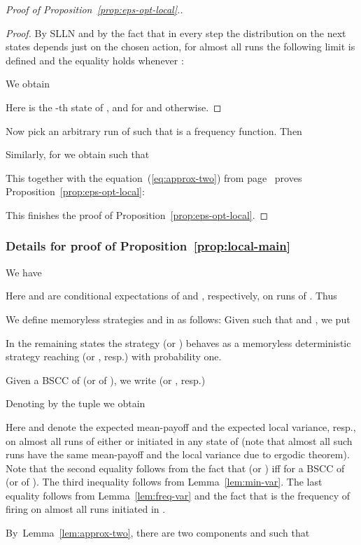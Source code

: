 \begin{proof}[Proof of Proposition~\ref{prop:eps-opt-local}.]
\begin{proof}
By SLLN and by the fact that in every step the distribution on the next states depends just on the chosen action, for almost all runs  the following limit is defined and the equality holds whenever :

We obtain

Here  is the -th state of , and  for  and  otherwise.


\end{proof}
\noindent
Now pick an arbitrary run  of  such that  is a frequency function. Then

Similarly, for  we obtain  such that 

This together with the equation~(\ref{eq:approx-two}) from page~\pageref{eq:approx-two} proves Proposition~\ref{prop:eps-opt-local}:

This finishes the proof of Proposition~\ref{prop:eps-opt-local}.
\end{proof}

\subsubsection{Details for proof of Proposition~\ref{prop:local-main}}\label{app-local-main}
We have

Here  and  are conditional expectations of  and , respectively, on runs of .
Thus



We define memoryless strategies  and  in  as follows: Given  such that  and , we put

In the remaining states  the strategy  (or ) behaves as a memoryless deterministic strategy reaching  (or , resp.) with probability one.

Given a BSCC  of  (or  of ), we write  (or , resp.)

Denoting by  the tuple  we obtain

Here  and  denote the expected mean-payoff and the expected local variance, resp., on almost all runs of either  or  initiated in any state of  (note that almost all such runs have the same mean-payoff and the local variance due to ergodic theorem).
Note that the second equality follows from the fact that  (or ) iff  for a BSCC  of  (or of ). The third inequality follows from Lemma~\ref{lem:min-var}. The last equality follows from Lemma~\ref{lem:freq-var} and the fact that  is the frequency of firing  on almost all runs initiated in .

By~Lemma~\ref{lem:approx-two}, there are two components  and  such that

